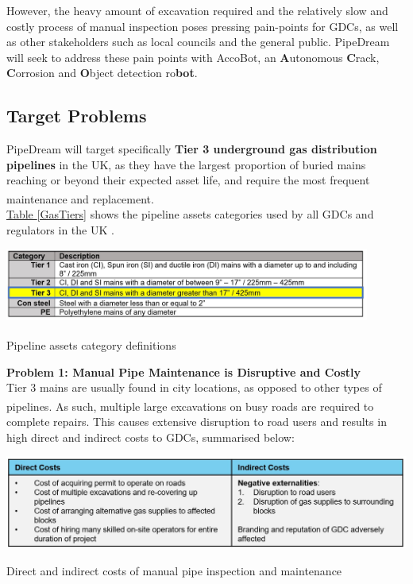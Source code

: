 \documentclass[11pt]{article}		%
\newcommand{\supercite}[1]{\textsuperscript{\cite{#1}}}		%
\newcommand{\tableref}[1]{\hyperref[#1]{Table \ref*{#1}}}     %
\begin{document}
		\vspace{-0.75cm}
		However, the heavy amount of excavation required and the relatively slow and costly process of manual inspection poses pressing pain-points for GDCs, as well as other stakeholders such as local councils and the general public. PipeDream will seek to address these pain points with AccoBot, an \textbf{A}utonomous \textbf{C}rack, \textbf{C}orrosion and \textbf{O}bject detection ro\textbf{bot}. 
		
	\subsection[Target Problems]{Target Problems}
	
	PipeDream will target specifically \textbf{Tier 3 underground gas distribution pipelines} in the UK, as they have the largest proportion of buried mains reaching or beyond their expected asset life, and require the most frequent maintenance and replacement\supercite{tier3}.\\
	
	
	\tableref{GasTiers} shows the pipeline assets categories used by all GDCs and regulators in the UK .
		\begin{table}[h]
			\centering
			\includegraphics[width=0.9\textwidth]{GasTiers}
			\caption{Pipeline assets category definitions\supercite{tier3}}
			\label{GasTiers}
 		\end{table}
 	\vspace{-0.5cm}
 	
    \textbf{Problem 1: Manual Pipe Maintenance is Disruptive and Costly}\\
    Tier 3 mains are usually found in city locations, as opposed to other types of pipelines\supercite{tier3hse}. As such, multiple large excavations on busy roads are required to complete repairs. This causes extensive disruption to road users and results in high direct and indirect costs to GDCs, summarised below:
    		\begin{table}[h]
			\centering
			\includegraphics[width=\textwidth]{costs.jpg}
			\caption{Direct and indirect costs of manual pipe inspection and maintenance}
			\label{PipeInspectionCosts}
 		\end{table}
 	\vspace{-0.5cm}
    
\end{document}
